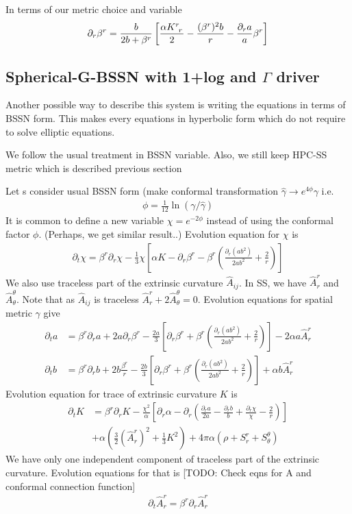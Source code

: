\documentclass[prd]{revtex4}
\newcommand*\apost{\textsc{\char13}}
\newcommand{\TODO}[1]{{\color{red}[}{\color{red}TODO:} {\color{blue}#1}{\color{red}]}}
\begin{document}
In terms of our metric choice and variable
\begin{align}
\partial_r \beta^r = \frac{b}{2b+\beta^r} \left[\frac{\alpha K\indices{^r_r}}{2} - \frac{(\beta^r)^2 b}{r}- \frac{\partial_r a}{a} \beta^r \right]
\end{align}

\subsection{Spherical-G-BSSN with 1+log and $\Gamma$ driver}
Another possible way to describe this system is writing the equations in terms of BSSN form. This makes every equations
in hyperbolic form which do not require to solve elliptic equations.

We follow the usual treatment in BSSN variable. Also, we still keep HPC-SS metric which is described previous section

Let \apost s consider usual BSSN form (make conformal transformation $\hat{\gamma} \rightarrow e^{4\phi} \gamma$ i.e.
\begin{align}
\phi = \frac{1}{12} \ln(\gamma / \hat{\gamma})
\end{align}
It is common to define a new variable $\chi = e^{-2 \phi}$ instead of using the conformal factor $\phi$. (Perhaps, we get similar result..) Evolution equation for $\chi$ is
\begin{align}
\partial_t \chi = \beta^r \partial_r \chi - \frac{1}{3} \chi \left[ \alpha K - \partial_r \beta^r - \beta^r \left(\frac{\partial_r (a b^2)}{2 a b^2} + \frac{2}{r}\right) \right]
\end{align}
We also use traceless part of the extrinsic curvature $\hat{A}_{ij}$. In SS, we have $\hat{A}^r_r$ and $\hat{A}^\theta_\theta$. Note that as $\hat{A}_{ij}$ is traceless $\hat{A}^r_r+2\hat{A}^\theta_\theta=0$. Evolution equations for spatial metric $\gamma$ give
\begin{align}
\partial_t a &= \beta^r \partial_r a + 2 a \partial_r \beta^r - \frac{2a}{3}\left[ \partial_r \beta^r +\beta^r \left(\frac{\partial_r (a b^2)}{2 a b^2} + \frac{2}{r}\right)\right] -2 \alpha a \hat{A}^r_r \\
\partial_t b &= \beta^r \partial_r b + 2 b \frac{\beta^r}{r} - \frac{2b}{3} \left[\partial_r \beta^r + \beta^r \left(\frac{\partial_r (a b^2)}{2 a b^2} + \frac{2}{r}\right)\right] + \alpha b \hat{A}^r_r
\end{align}
Evolution equation for trace of extrinsic curvature $K$ is
\begin{align}
\partial_t K &= \beta^r \partial_r K - \frac{\chi^2}{\alpha} \left[\partial_r \alpha - \partial_r \left(\frac{\partial_r a}{2a} - \frac{\partial_r b}{b} +\frac{\partial_r \chi}{\chi} - \frac{2}{r} \right) \right] \nonumber \\
&+ \alpha \left(\frac{3}{2} (\hat{A}^r_r)^2 + \frac{1}{3} K^2 \right) + 4 \pi \alpha (\rho + S^r_r + S^\theta_\theta)
\end{align}
We have only one independent component of traceless part of the extrinsic curvature. Evolution equations for that is
\TODO {Check eqns for A and conformal connection function}
\begin{align}
\partial_t \hat{A}^r_r = \beta^r \partial_r \hat{A}^r_r 
\end{align}
\end{document}
